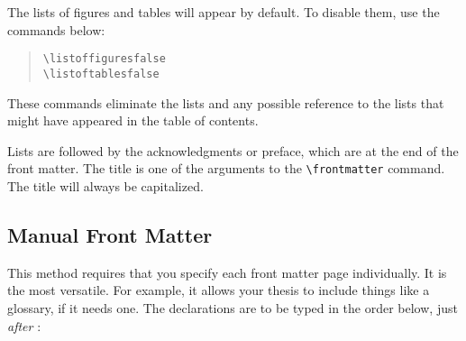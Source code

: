 The lists of figures and tables will appear by default. To disable them,
use the commands below:
\begin{quote}
\verb|\listoffiguresfalse|\\
\verb|\listoftablesfalse|
\end{quote}
These commands eliminate the lists and any possible reference to the
lists that might have appeared in the table of contents.

Lists are followed by the acknowledgments or preface, which are at the
end of the front matter.  The title is one of the arguments to the
\verb|\frontmatter| command. The title will always be capitalized.

\subsection{Manual Front Matter}

This method requires that you specify each front matter page
individually. It is the most versatile. For example, it allows your
thesis to include things like a glossary, if it needs one. The
declarations are to be typed in the order below, just {\em after}
\verb||:

